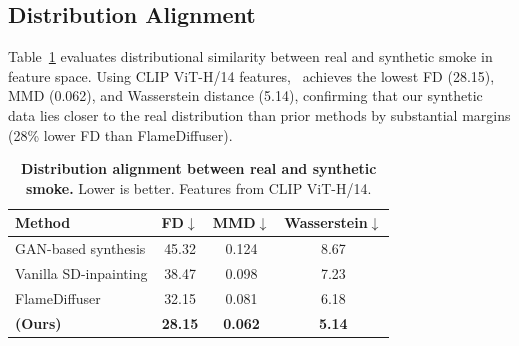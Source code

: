 \documentclass[journal]{IEEEtran}
\begin{document}
\begin{table}[t]
\centering
\caption{Quantitative comparison of generative performance. Best results are shown in bold.}
\label{tab:quantitative}
\end{table}

\subsection{Distribution Alignment}

Table~\ref{tab:distribution} evaluates distributional similarity between real and synthetic smoke in feature space. Using CLIP ViT-H/14 features, \method~achieves the lowest FD (28.15), MMD (0.062), and Wasserstein distance (5.14), confirming that our synthetic data lies closer to the real distribution than prior methods by substantial margins (28\% lower FD than FlameDiffuser).

\begin{table}[t]
\centering
\caption{\textbf{Distribution alignment between real and synthetic smoke.} Lower is better. Features from CLIP ViT-H/14.}
\label{tab:distribution}
\begin{tabular}{lccc}
\toprule
Method & FD$\downarrow$ & MMD$\downarrow$ & Wasserstein$\downarrow$ \\
\midrule
GAN-based synthesis \cite{rs12223715} & 45.32 & 0.124 & 8.67 \\
Vanilla SD-inpainting & 38.47 & 0.098 & 7.23 \\
FlameDiffuser \cite{wang2024flamediffuserwildfireimage} & 32.15 & 0.081 & 6.18 \\
\textbf{\method{} (Ours)} & \textbf{28.15} & \textbf{0.062} & \textbf{5.14} \\
\bottomrule
\end{tabular}
\end{table}
\end{document}
